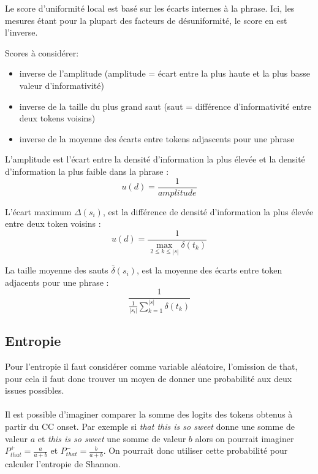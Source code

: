 \documentclass{article}
\begin{document}
Le score d'uniformité local est basé sur les écarts internes à la phrase. Ici, les mesures étant pour la plupart 
des facteurs de désuniformité, le score en est l'inverse.

Scores à considérer:

\begin{itemize}
    \item inverse de l'amplitude (amplitude = écart entre la plus haute et la plus basse valeur d'informativité)
    \item inverse de la taille du plus grand saut (saut = différence d'informativité entre deux tokens voisins)
    \item inverse de la moyenne des écarts entre tokens adjascents pour une phrase
\end{itemize}

L'amplitude est l'écart entre la densité d'information la plus élevée et la densité d'information la plus faible dans la phrase :
\begin{equation}
    u(d) = \frac{1}{amplitude}
\end{equation}

L'écart maximum $\Delta(s_i)$, est la différence de densité d'information la plus élevée entre deux token voisins :
\begin{equation}
    u(d) = \frac{1}{\max_{2\leq k \leq |s|} \delta(t_k)}
\end{equation}

La taille moyenne des sauts $\bar{\delta}(s_i)$, est la moyenne des écarts entre token adjacents pour une phrase :
\begin{equation}
    \frac{1}{\frac{1}{|s_i|} \sum^{|s|}_{k=1} \delta(t_k)}
\end{equation}

\subsection{Entropie}

Pour l'entropie il faut considérer comme variable aléatoire, l'omission de that, pour cela il faut donc trouver un moyen de donner une probabilité aux deux issues possibles.\\
\\
Il est possible d'imaginer comparer la somme des logits des tokens obtenus à partir du CC onset. Par exemple si \textit{that this is so sweet} donne une somme de valeur $a$ et \textit{this is so sweet} une somme de valeur $b$ alors on pourrait imaginer $P_{that}^+ = \frac{a}{a+b}$ et $P_{that}^- = \frac{b}{a+b}$. On pourrait donc utiliser cette probabilité pour calculer l'entropie de Shannon.\\
\end{document}
